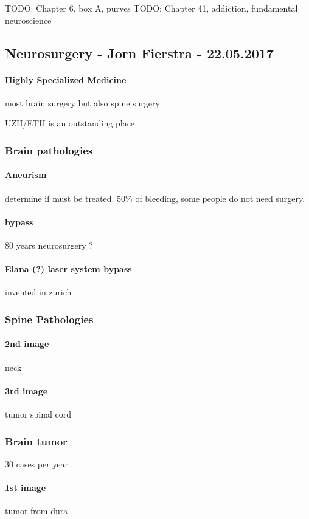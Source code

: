 \documentclass[12pt,article,oneside,a4paper]{memoir}
\begin{document}
TODO: Chapter 6, box A, purves
TODO: Chapter 41, addiction, fundamental neuroscience

\newpage
\subsection{Neurosurgery - Jorn Fierstra - 22.05.2017}
\paragraph{Highly Specialized Medicine} most brain surgery but also spine surgery

UZH/ETH is an outstanding place

\subsubsection{Brain pathologies}
\paragraph{Aneurism} determine if must be treated. 50\% of bleeding, some people do not need surgery.
\paragraph{bypass} 80 years neurosurgery ?
\paragraph{Elana (?) laser system bypass} invented in zurich

\subsubsection{Spine Pathologies}
\paragraph{2nd image} neck
\paragraph{3rd image} tumor spinal cord

\subsubsection{Brain tumor} 30 cases per year
\paragraph{1st image} tumor from dura
\end{document}

